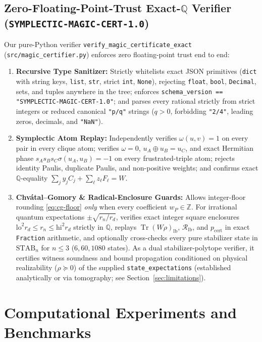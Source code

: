 \documentclass[11pt,a4paper]{article}
\theoremstyle{definition}
\theoremstyle{remark}
\newcommand{\Z}{\mathbb{Z}}
\newcommand{\Q}{\mathbb{Q}}
\newcommand{\STAB}{\mathrm{STAB}}
\newcommand{\RoM}{\mathcal{R}}
\newcommand{\Tr}{\operatorname{Tr}}
\newcommand{\Code}[1]{{\small\texttt{#1}}}
\begin{document}
\subsection{Zero-Floating-Point-Trust Exact-\texorpdfstring{$\Q$}{Q} Verifier (\texorpdfstring{\Code{SYMPLECTIC-MAGIC-CERT-1.0}}{SYMPLECTIC-MAGIC-CERT-1.0})}
Our pure-Python verifier \Code{verify\_\allowbreak magic\_\allowbreak certificate\_\allowbreak exact} (\Code{src/\allowbreak magic\_\allowbreak certifier.py}) enforces zero floating-point trust end to end:
\begin{enumerate}[leftmargin=1.8em,itemsep=2pt]
  \item \textbf{Recursive Type Sanitizer:} Strictly whitelists exact JSON primitives (\Code{dict} with string keys, \Code{list}, \Code{str}, strict \Code{int}, \Code{None}), rejecting \Code{float}, \Code{bool}, \Code{Decimal}, sets, and tuples anywhere in the tree; enforces \Code{schema\_version == "SYMPLECTIC-MAGIC-CERT-1.0"}; and parses every rational strictly from strict integers or reduced canonical \Code{"p/q"} strings ($q > 0$, forbidding \Code{"2/4"}, leading zeros, decimals, and \Code{"NaN"}).
  \item \textbf{Symplectic Atom Replay:} Independently verifies $\omega(u, v) = 1$ on every pair in every clique atom; verifies $\omega = 0$, $u_A \oplus u_B = u_C$, and exact Hermitian phase $s_A s_B s_C \sigma(u_A, u_B) = -1$ on every frustrated-triple atom; rejects identity Paulis, duplicate Paulis, and non-positive weights; and confirms exact $\Q$-equality $\sum_j y_j C_j + \sum_\ell z_\ell F_\ell = W$.
  \item \textbf{Chv\'atal--Gomory \& Radical-Enclosure Guards:} Allows integer-floor rounding \eqref{eq:cg-floor} \emph{only} when every coefficient $w_P \in \Z$. For irrational quantum expectations $\pm\sqrt{r_n/r_d}$, verifies exact integer square enclosures $\mathrm{lo}^2 r_d \le r_n \le \mathrm{hi}^2 r_d$ strictly in $\Q$, replays $\Tr(W\rho)_{\mathrm{lb}}$, $\RoM_{\mathrm{lb}}$, and $p_{\mathrm{cert}}$ in exact \Code{Fraction} arithmetic, and optionally cross-checks every pure stabilizer state in $\STAB_n$ for $n \le 3$ ($6, 60, 1080$ states). As a dual stabilizer-polytope verifier, it certifies witness soundness and bound propagation conditioned on physical realizability ($\rho \succeq 0$) of the supplied \Code{state\_expectations} (established analytically or via tomography; see Section~\ref{sec:limitations}).
\end{enumerate}

\section{Computational Experiments and Benchmarks}
\label{sec:experiments}
\end{document}
